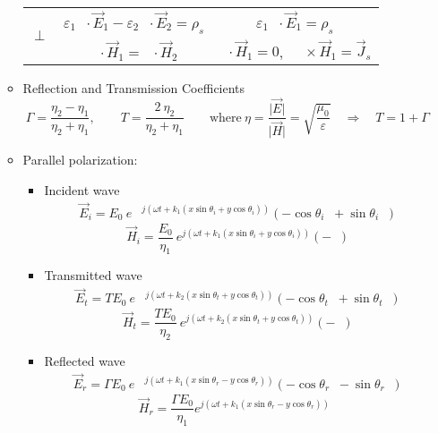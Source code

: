 \documentclass[a4paper, 11pt]{article}
\DeclareMathOperator{\hn}{\hat{\boldsymbol{n}}}
\DeclareMathOperator{\hx}{\hat{\boldsymbol{x}}}
\DeclareMathOperator{\hy}{\hat{\boldsymbol{y}}}
\DeclareMathOperator{\hz}{\hat{\boldsymbol{z}}}
\begin{document}
\begin{enumerate}
\begin{itemize}[leftmargin=*]
\begin{table}[H]
\begin{tabular}{ccc}
            \multirow{2}{*}{$\perp$} & $\varepsilon_{1}\hn\cdot\vec{E}_{1}-\varepsilon_{2}\hn\cdot\vec{E}_{2}=\rho_{s}$  & $\varepsilon_{1} \hn\cdot\vec{E}_{1}=\rho_{s}$ \\
            &                  $\hn\cdot\vec{H}_{1}=\hn\cdot\vec{H}_{2}$ & $\hn\cdot\vec{H}_{1}=0$, \ $\hn\times \vec{H}_{1}=\vec{J}_{s}$ \\ 
            \bottomrule
		\end{tabular}
        \end{table}
  
	\item Reflection and Transmission Coefficients
        \[
            \Gamma=\frac{\eta_{2}-\eta_{1}}{\eta_{2}+\eta_{1}}, 
            \quad \quad 
            T=\frac{2 \ \eta_{2}}{\eta_{2}+\eta_{1}}
            \quad \quad 
            \text{where} \ \eta=\frac{\lvert \vec{E} \rvert}{\lvert \vec{H} \rvert}=\sqrt{\frac{\mu_{0}}{\varepsilon}} \quad \Rightarrow \quad T=1+\Gamma 
        \]
        
	\item Parallel polarization:
	\begin{itemize}[leftmargin=*]
		\item Incident wave 
            \begin{align*}
                \vec{E}_{i}
                = E_{0} \  e&^{{j(\omega t + k_{1}(x\sin\theta_{i} + y \cos \theta_{i}))}} (-\cos \theta_{i} \hx + \sin \theta_{i} \hy)
            \end{align*}
		\[
                \vec{H}_{i} = 
                \frac{E_{0}}{\eta_{1}} \ e^{j(\omega t+k_{1}(x\sin\theta_{i}+y\cos\theta_{i}))}(-\hz)
            \]
            
		\item Transmitted wave 
            \begin{align*}
                \vec{E}_{t} = TE_{0} \ e& ^{j(\omega t+k_{2}( x \sin \theta_{t} + y \cos \theta_{t}))} (-\cos \theta_{t} \hx + \sin \theta_{t} \hy) 
            \end{align*}
		\[
                \vec{H}_{t} = 
                \frac{TE_{0}}{\eta_{2}} \ e^{j(\omega t+k_{2}(x\sin\theta_{t}+y\cos\theta_{t}))}(-\hz)
            \]
            
		\item Reflected wave 
            \begin{align*}
                \vec{E}_{r} = \Gamma E_{0} \ e & ^{j(\omega t+k_{1}(x\sin\theta_{r}-y\cos\theta_{r}))} (-\cos\theta_{r}\hx-\sin\theta_{r}\hy)    
            \end{align*}
		\[
                \vec{H}_{r}=\frac{\Gamma E_{0}}{\eta_{1}}e^{j(\omega t+k_{1}(x\sin\theta_{r}-y\cos\theta_{r}))}\hz
            \]
	\end{itemize}
 

\end{itemize}
\end{enumerate}
\end{document}

